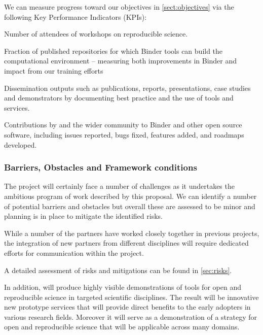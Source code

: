 We can measure progress toward our objectives in \ref{sect:objectives}
via the following Key Performance Indicators (KPIs):
\begin{compactenum}
  \item \label{kpi:workshop-attendees}
    Number of attendees of \TheProject workshops on reproducible science.
  \item \label{kpi:binder-publications}
    Fraction of published repositories for which Binder tools can build the computational
    environment -- measuring both improvements in Binder and impact from our training efforts
  \item \label{kpi:dissemination} Dissemination outputs such as publications, reports,
    presentations, case studies and demonstrators by \TheProject documenting best
    practice and the use of \TheProject tools and services. 
  \item \label{kpi:contributions} Contributions by \TheProject and the
    wider community to Binder and other open source software, including
  issues reported, bugs fixed, features added, and roadmaps developed. 
\end{compactenum}

\subsubsection{Barriers, Obstacles and Framework conditions}

The \TheProject project will certainly face a number of challenges as it undertakes
the ambitious program of work described by this proposal.
We can identify a number of potential barriers and obstacles but overall
these are assessed to be minor and planning is in place to mitigate the
identified risks.

While a number of the partners have worked closely together in previous projects,
the integration of new partners from different disciplines will require
dedicated efforts for communication within the project.

A detailed assessment of risks and mitigations can be found in \ref{sec:risks}.

In addition, \TheProject will produce highly visible demonstrations of
tools for open and reproducible science in targeted scientific disciplines.
The result will be innovative new prototype services that will provide
direct benefits to the early adopters in various research fields.
Moreover it will serve as a demonstration of a strategy for open and reproducible science
that will be applicable across many domains.

